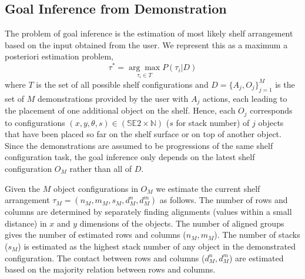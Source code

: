 

\subsection{Goal Inference from Demonstration}
\label{sec:irosinference}

The problem of goal inference is the estimation of most likely shelf arrangement based on the input obtained from the user.
We represent this as a maximum a posteriori estimation problem, \ie
\begin{equation} \label{eqn:optimize}
\tau^* = \underset{\tau_i \in T}{\arg\max} P(\tau_i|D)
\end{equation}
where $T$ is the set of all possible shelf configurations and $D = \{ A_j, O_j \}_{j=1}^{M}$ is the set of $M$ demonstrations provided by the user with $A_j$ actions, each leading to the placement of one additional object on the shelf. 
Hence, each $O_j$ corresponds to configurations $(x, y, \theta, s) \in (\mathbb{SE}2 \times \mathbb{N})$ ($s$ for stack number) of $j$ objects that have been placed so far on the shelf surface or on top of another object.
Since the demonstrations are assumed to be progressions of the same shelf configuration task, the goal inference only depends on the latest shelf configuration $O_M$ rather than all of $D$.

Given the $M$ object configurations in $O_M$ we estimate the current shelf arrangement $\tau_M = (n_M, m_M, s_M, d^n_M, d^m_M)$ as follows. 
The number of rows and columns are determined by separately finding alignments (\ie values within a small distance) in $x$ and $y$ dimensions of the objects.
The number of aligned groups gives the number of estimated rows and columns ($n_M, m_M$).
The number of stacks ($s_M$) is estimated as the highest stack number of any object in the demonstrated configuration.
The contact between rows and columns  ($d^n_M, d^m_M$) are estimated based on the majority relation between rows and columns.

